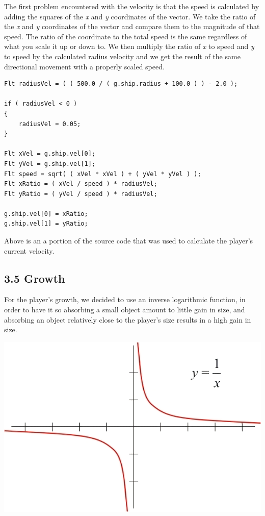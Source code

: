 \documentclass[12pt]{report}
\begin{document}
\medskip
The first problem encountered with the velocity is that the speed is calculated by adding the squares of the \textit{x} and \textit{y} coordinates of the vector. We take the ratio of the \textit{x} and \textit{y} coordinates of the vector and compare them to the magnitude of that speed. The ratio of the coordinate to the total speed is the same regardless of what you scale it up or down to. We then multiply the ratio of \textit{x} to speed and \textit{y} to speed by the calculated radius velocity and we get the result of the same directional movement with a properly scaled speed. \bigskip

\begin{lstlisting}
Flt radiusVel = ( ( 500.0 / ( g.ship.radius + 100.0 ) ) - 2.0 );

if ( radiusVel < 0 )
{
	radiusVel = 0.05;
}

Flt xVel = g.ship.vel[0];
Flt yVel = g.ship.vel[1];
Flt speed = sqrt( ( xVel * xVel ) + ( yVel * yVel ) );
Flt xRatio = ( xVel / speed ) * radiusVel;
Flt yRatio = ( yVel / speed ) * radiusVel;

g.ship.vel[0] = xRatio;
g.ship.vel[1] = yRatio;
\end{lstlisting}

\noindent Above is an a portion of the source code that was used to calculate the player's current velocity.

\newpage
\subsection*{3.5 Growth}
For the player's growth, we decided to use an inverse logarithmic function, in order to have it so absorbing a small object amount to little gain in size, and absorbing an object relatively close to the player's size results in a high gain in size. \bigskip

\includegraphics[width=\textwidth]{inverse_log_graph}
\end{document}
